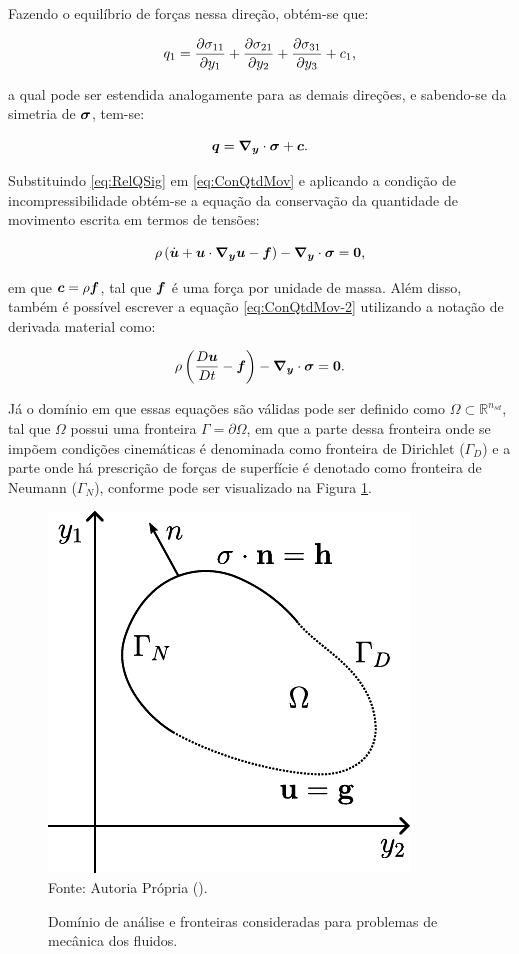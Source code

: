 Fazendo o equilíbrio de forças nessa direção, obtém-se que:

\begin{equation}
    q_1=\frac{\partial{\sigma_{11}}}{\partial{y_1}}+\frac{\partial{\sigma_{21}}}{\partial{y_2}}+\frac{\partial{\sigma_{31}}}{\partial{y_3}}+c_1\text{,}
\end{equation}

\noindent a qual pode ser estendida analogamente para as demais direções, e sabendo-se da simetria de $\boldsymbol{\sigma}$, tem-se:

\begin{equation}
    \boldsymbol{q}=\boldsymbol{\nabla_y}\cdot\boldsymbol{\sigma}+\boldsymbol{c}\text{.}
    \label{eq:RelQSig}
\end{equation}

Substituindo \eqref{eq:RelQSig} em \eqref{eq:ConQtdMov} e aplicando a condição de incompressibilidade obtém-se a equação da conservação da quantidade de movimento escrita em termos de tensões:

\begin{equation}
    \rho\left({\dot{\boldsymbol{u}}+\boldsymbol{u}\cdot\boldsymbol{\nabla_y}\boldsymbol{u}-\boldsymbol{f}}\right)-\boldsymbol{\nabla_y}\cdot\boldsymbol{\sigma}=\boldsymbol{0}\text{,}
    \label{eq:ConQtdMov-2}
\end{equation}

\noindent em que $\boldsymbol{c}=\rho\boldsymbol{f}$, tal que $\boldsymbol{f}$ é uma força por unidade de massa. Além disso, também é possível escrever a equação \eqref{eq:ConQtdMov-2} utilizando a notação de derivada material como:

\begin{equation}
    \rho\left({\frac{D\boldsymbol{u}}{Dt}-\boldsymbol{f}}\right)-\boldsymbol{\nabla_y}\cdot\boldsymbol{\sigma}=\boldsymbol{0}\text{.}
    \label{eq:ConQtdMov-3}
\end{equation}

Já o domínio em que essas equações são válidas pode ser definido como $\Omega\subset\mathbb{R}^{n_{sd}}$, tal que $\Omega$ possui uma fronteira $\Gamma=\partial\Omega$, em que a parte dessa fronteira onde se impõem condições cinemáticas é denominada como fronteira de Dirichlet ($\Gamma_D$) e a parte onde há prescrição de forças de superfície é denotado como fronteira de Neumann ($\Gamma_N$), conforme pode ser visualizado na Figura \ref{fig:Dom}.

\begin{figure}[h!]
    \centering
    \caption{Domínio de análise e fronteiras consideradas para problemas de mecânica dos fluidos.}
    \includegraphics[width=.35\linewidth]{Figuras/Dom}
    \\Fonte: Autoria Própria (\the\year).
    \label{fig:Dom}
\end{figure}

